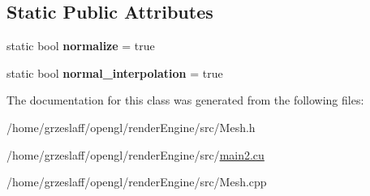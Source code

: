 \subsection*{Static Public Attributes}
\begin{DoxyCompactItemize}
\item 
\hypertarget{classMesh_a0d652372a1bd8f965eea782cd754e010}{static bool {\bfseries normalize} = true}\label{classMesh_a0d652372a1bd8f965eea782cd754e010}

\item 
\hypertarget{classMesh_a72ffce1433680a5f74a3f90e3f34fa80}{static bool {\bfseries normal\-\_\-interpolation} = true}\label{classMesh_a72ffce1433680a5f74a3f90e3f34fa80}

\end{DoxyCompactItemize}


The documentation for this class was generated from the following files\-:\begin{DoxyCompactItemize}
\item 
/home/grzeslaff/opengl/render\-Engine/src/Mesh.\-h\item 
/home/grzeslaff/opengl/render\-Engine/src/\hyperlink{main2_8cu}{main2.\-cu}\item 
/home/grzeslaff/opengl/render\-Engine/src/Mesh.\-cpp\end{DoxyCompactItemize}
